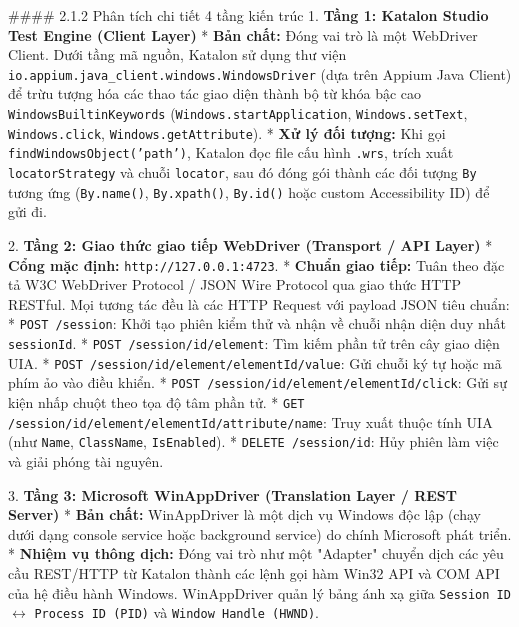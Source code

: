 #### 2.1.2 Phân tích chi tiết 4 tầng kiến trúc
1. \textbf{Tầng 1: Katalon Studio Test Engine (Client Layer)}
   * \textbf{Bản chất:} Đóng vai trò là một WebDriver Client. Dưới tầng mã nguồn, Katalon sử dụng thư viện \texttt{io.appium.java_client.windows.WindowsDriver} (dựa trên Appium Java Client) để trừu tượng hóa các thao tác giao diện thành bộ từ khóa bậc cao \texttt{WindowsBuiltinKeywords} (\texttt{Windows.startApplication}, \texttt{Windows.setText}, \texttt{Windows.click}, \texttt{Windows.getAttribute}).
   * \textbf{Xử lý đối tượng:} Khi gọi \texttt{findWindowsObject('path')}, Katalon đọc file cấu hình \texttt{.wrs}, trích xuất \texttt{locatorStrategy} và chuỗi \texttt{locator}, sau đó đóng gói thành các đối tượng \texttt{By} tương ứng (\texttt{By.name()}, \texttt{By.xpath()}, \texttt{By.id()} hoặc custom Accessibility ID) để gửi đi.

2. \textbf{Tầng 2: Giao thức giao tiếp WebDriver (Transport / API Layer)}
   * \textbf{Cổng mặc định:} \texttt{http://127.0.0.1:4723}.
   * \textbf{Chuẩn giao tiếp:} Tuân theo đặc tả W3C WebDriver Protocol / JSON Wire Protocol qua giao thức HTTP RESTful. Mọi tương tác đều là các HTTP Request với payload JSON tiêu chuẩn:
     * \texttt{POST /session}: Khởi tạo phiên kiểm thử và nhận về chuỗi nhận diện duy nhất \texttt{sessionId}.
     * \texttt{POST /session/{id}/element}: Tìm kiếm phần tử trên cây giao diện UIA.
     * \texttt{POST /session/{id}/element/{elementId}/value}: Gửi chuỗi ký tự hoặc mã phím ảo vào điều khiển.
     * \texttt{POST /session/{id}/element/{elementId}/click}: Gửi sự kiện nhấp chuột theo tọa độ tâm phần tử.
     * \texttt{GET /session/{id}/element/{elementId}/attribute/{name}}: Truy xuất thuộc tính UIA (như \texttt{Name}, \texttt{ClassName}, \texttt{IsEnabled}).
     * \texttt{DELETE /session/{id}}: Hủy phiên làm việc và giải phóng tài nguyên.

3. \textbf{Tầng 3: Microsoft WinAppDriver (Translation Layer / REST Server)}
   * \textbf{Bản chất:} WinAppDriver là một dịch vụ Windows độc lập (chạy dưới dạng console service hoặc background service) do chính Microsoft phát triển.
   * \textbf{Nhiệm vụ thông dịch:} Đóng vai trò như một "Adapter" chuyển dịch các yêu cầu REST/HTTP từ Katalon thành các lệnh gọi hàm Win32 API và COM API của hệ điều hành Windows. WinAppDriver quản lý bảng ánh xạ giữa \texttt{Session ID} $\leftrightarrow$ \texttt{Process ID (PID)} và \texttt{Window Handle (HWND)}.

